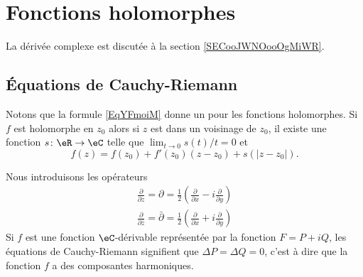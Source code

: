 
\section{Fonctions holomorphes}

La dérivée complexe est discutée à la section \ref{SECooJWNOooOgMiWR}.

\subsection{Équations de Cauchy-Riemann}

Notons que la formule \eqref{EqYFmoiM} donne un  pour les fonctions holomorphes. Si \( f\) est holomorphe en \( z_0\) alors si \( z\) est dans un voisinage de \( z_0\), il existe une fonction \( s\colon \eR\to \eC\) telle que \( \lim_{t\to 0} s(t)/t=0\) et 
\begin{equation}    \label{EqptwBFG}
    f(z)=f(z_0)+f'(z_0)(z-z_0)+s(| z-z_0 |).
\end{equation}

Nous introduisons les opérateurs
\begin{subequations}
    \begin{align}
        \frac{ \partial  }{ \partial z }=\partial=\frac{ 1 }{2}\left( \frac{ \partial  }{ \partial x }-i\frac{ \partial  }{ \partial y } \right)\\
        \frac{ \partial  }{ \partial \bar z }=\bar\partial=\frac{ 1 }{2}\left( \frac{ \partial  }{ \partial x }+i\frac{ \partial  }{ \partial y } \right)
    \end{align}
\end{subequations}
Si \( f\) est une fonction $\eC$-dérivable représentée par la fonction \( F=P+iQ\), les équations de Cauchy-Riemann signifient que \( \Delta P=\Delta Q=0\), c'est à dire que la fonction \( f\) a des composantes harmoniques.

